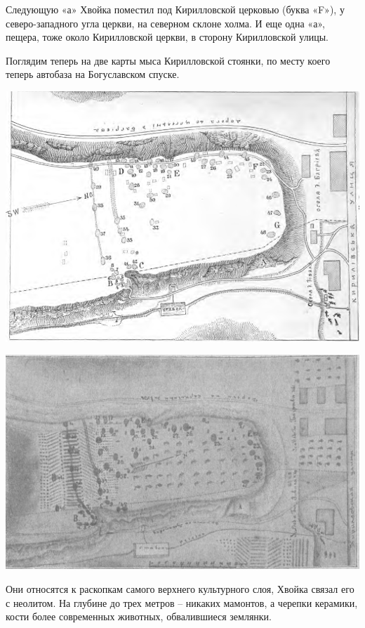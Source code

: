 Следующую «а» Хвойка поместил под Кирилловской церковью (буква «F»), у северо-западного угла церкви, на северном склоне холма. И еще одна «а», пещера, тоже около Кирилловской церкви, в сторону Кирилловской улицы.

Поглядим теперь на две карты мыса Кирилловской стоянки, по месту коего теперь автобаза на Богуславском спуске.

\begin{center}
\includegraphics[width=\linewidth]{chast-kirvys/kirstoy/1893-hvoyka-01.png}
\end{center}

\begin{center}
\includegraphics[width=\linewidth]{chast-kirvys/kirstoy/1893-hvoyka-02.png}
\end{center}

Они относятся к раскопкам самого верхнего культурного слоя, Хвойка связал его с неолитом. На глубине до трех метров – никаких мамонтов, а черепки керамики, кости более современных животных, обвалившиеся землянки.  

